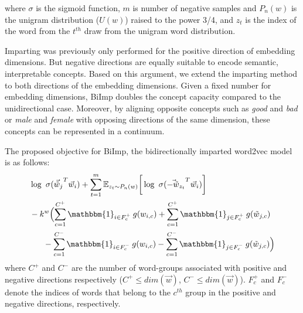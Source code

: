 \documentclass[11pt,a4paper]{article}
\newcommand{\indicator}{\ensuremath{\mathbbm{1}}}
\def\proposedmethod{BiImp}
\begin{document}
where $\sigma$ is the sigmoid function, $m$ is number of
negative samples and $P_n(w)$ is the unigram distribution
($U(w)$) raised to the power 3/4, and $z_t$ is the index of the word from the $t^{th}$ draw from the unigram word distribution.


Imparting was previously only performed
for the positive direction of embedding dimensions.
But negative directions are equally suitable to encode semantic, interpretable concepts. Based on this argument, we extend the imparting method to both directions of the embedding dimensions. 
Given a fixed number for embedding dimensions, \proposedmethod{} doubles the concept capacity compared to the unidirectional case. Moreover, by aligning opposite concepts such as \textit{good} and \textit{bad} or \textit{male} and \textit{female} with opposing directions of the same dimension, these concepts can be represented in a continuum.

The proposed objective for \proposedmethod{}, the bidirectionally imparted word2vec model is as follows:
\begin{align}
\begin{split}
& \log ~ \sigma ({\vec{\tilde{w}}_{j}}^T \vec{w}_{i}) + \sum_{t = 1}^{m} {\mathbb{E}}_{z_t \sim P_n(w)} \bigg[ \log ~ \sigma({\vec{-\tilde{w}}_{z_t}}^T \vec{w}_{i}) \bigg] \\ 
& -k^w \Bigl(  \sum_{c=1}^{C^+} \indicator_{i\in{}F^+_c} \: g(w_{i,c}) + \sum_{c=1}^{C^+} \indicator_{j \in F^+_c} \: g(\tilde{w}_{j,c}) \\
& ~~~~~ - \sum_{c=1}^{C^-} \indicator_{i\in{}F^-_c} \: g(w_{i,c}) - \sum_{c=1}^{C^-} \indicator_{j \in F^-_c} \: g(\tilde{w}_{j,c}) \Bigr)
\end{split}
\label{eq:word2vec_bi}
\end{align}
where $C^+$ and $C^-$ are the number of word-groups associated with positive and negative directions respectively ($C^+ \leq dim(\vec{w})$, $C^- \leq dim(\vec{w})$). $F^+_c$ and $F^-_c$ denote the indices of words that belong to the $c^{th}$ group in the positive and negative directions, respectively. 
\end{document}
